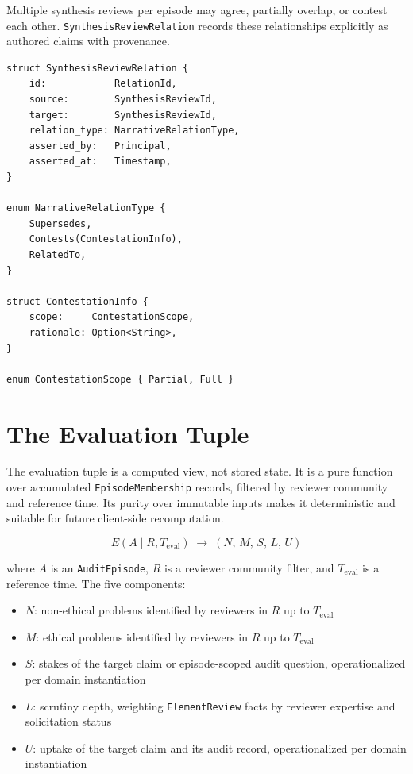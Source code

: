 \documentclass[11pt]{article}
\begin{document}
Multiple synthesis reviews per episode may agree, partially overlap, or
contest each other. \texttt{SynthesisReviewRelation} records these
relationships explicitly as authored claims with provenance.

\begin{lstlisting}
struct SynthesisReviewRelation {
    id:            RelationId,
    source:        SynthesisReviewId,
    target:        SynthesisReviewId,
    relation_type: NarrativeRelationType,
    asserted_by:   Principal,
    asserted_at:   Timestamp,
}

enum NarrativeRelationType {
    Supersedes,
    Contests(ContestationInfo),
    RelatedTo,
}

struct ContestationInfo {
    scope:     ContestationScope,
    rationale: Option<String>,
}

enum ContestationScope { Partial, Full }
\end{lstlisting}

\section{The Evaluation Tuple}

The evaluation tuple is a computed view, not stored state. It is a pure
function over accumulated \texttt{EpisodeMembership} records, filtered by
reviewer community and reference time. Its purity over immutable inputs makes
it deterministic and suitable for future client-side recomputation.

\[
E(A \mid R, T_\text{eval}) \;\to\; (N,\, M,\, S,\, L,\, U)
\]

where $A$ is an \texttt{AuditEpisode}, $R$ is a reviewer community filter,
and $T_\text{eval}$ is a reference time. The five components:

\begin{itemize}
  \item $N$: non-ethical problems identified by reviewers in $R$ up to $T_\text{eval}$
  \item $M$: ethical problems identified by reviewers in $R$ up to $T_\text{eval}$
  \item $S$: stakes of the target claim or episode-scoped audit question, operationalized per domain instantiation
  \item $L$: scrutiny depth, weighting \texttt{ElementReview} facts by reviewer expertise and solicitation status
  \item $U$: uptake of the target claim and its audit record, operationalized per domain instantiation
\end{itemize}
\end{document}
